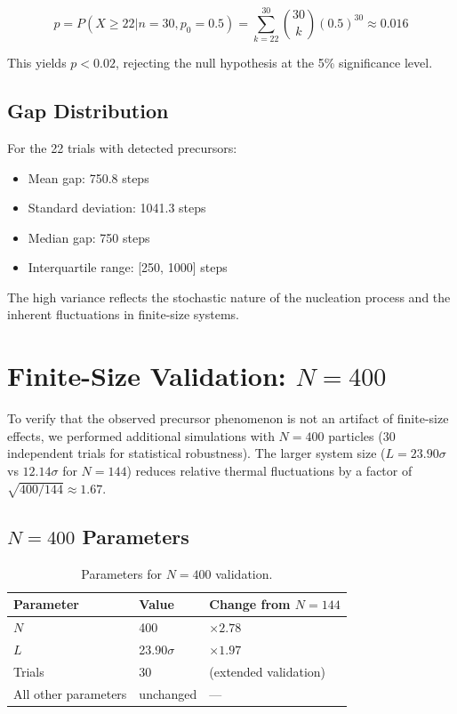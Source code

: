 \documentclass[11pt]{article}
\begin{document}
\begin{equation}
p = P(X \geq 22 | n=30, p_0=0.5) = \sum_{k=22}^{30} \binom{30}{k} (0.5)^{30} \approx 0.016
\end{equation}

This yields $p < 0.02$, rejecting the null hypothesis at the 5\% significance level.

\subsection{Gap Distribution}

For the 22 trials with detected precursors:
\begin{itemize}
    \item Mean gap: 750.8 steps
    \item Standard deviation: 1041.3 steps
    \item Median gap: 750 steps
    \item Interquartile range: [250, 1000] steps
\end{itemize}

The high variance reflects the stochastic nature of the nucleation process and the inherent fluctuations in finite-size systems.

\section{Finite-Size Validation: $N=400$}

To verify that the observed precursor phenomenon is not an artifact of finite-size effects, we performed additional simulations with $N=400$ particles (30 independent trials for statistical robustness). The larger system size ($L = 23.90\sigma$ vs $12.14\sigma$ for $N=144$) reduces relative thermal fluctuations by a factor of $\sqrt{400/144} \approx 1.67$.

\subsection{$N=400$ Parameters}

\begin{table}[h]
\centering
\caption{Parameters for $N=400$ validation.}
\label{tab:n400params}
\begin{tabular}{lll}
\toprule
\textbf{Parameter} & \textbf{Value} & \textbf{Change from $N=144$} \\
\midrule
$N$ & 400 & $\times 2.78$ \\
$L$ & 23.90$\sigma$ & $\times 1.97$ \\
Trials & 30 & (extended validation) \\
All other parameters & unchanged & --- \\
\bottomrule
\end{tabular}
\end{table}
\end{document}
